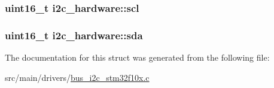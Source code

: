 \hypertarget{structi2c__hardware_ab5151d8d69e0ee681feae1f8159849e1}{
\subsubsection[{scl}]{\setlength{\rightskip}{0pt plus 5cm}uint16\+\_\+t i2c\+\_\+hardware\+::scl}}\label{structi2c__hardware_ab5151d8d69e0ee681feae1f8159849e1}
\hypertarget{structi2c__hardware_aedf614b92fd17411f6e62fd24e0bd3a1}{
\subsubsection[{sda}]{\setlength{\rightskip}{0pt plus 5cm}uint16\+\_\+t i2c\+\_\+hardware\+::sda}}\label{structi2c__hardware_aedf614b92fd17411f6e62fd24e0bd3a1}


The documentation for this struct was generated from the following file\+:\begin{DoxyCompactItemize}
\item 
src/main/drivers/\hyperlink{bus__i2c__stm32f10x_8c}{bus\+\_\+i2c\+\_\+stm32f10x.\+c}\end{DoxyCompactItemize}
